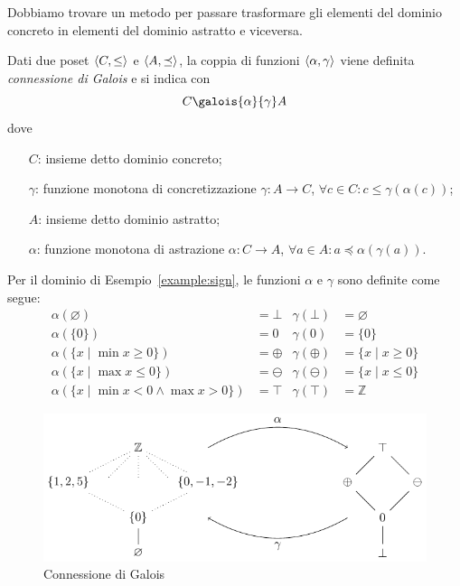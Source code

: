 Dobbiamo trovare un metodo per passare trasformare gli elementi del dominio concreto in elementi del dominio astratto e viceversa. 

\begin{definition}
Dati due poset $\langle C, \le \rangle$ e $\langle A, \preceq \rangle$, la coppia di funzioni $\langle \alpha, \gamma \rangle$ viene definita \emph{connessione di Galois} e si indica con 
\[ C \galois{\alpha}{\gamma} A \]
dove
\begin{itemize}
    \item[$C$:] insieme detto dominio concreto;
    \item[$\gamma$:] funzione monotona di concretizzazione $\gamma : A \to C$, $\forall c \in C : c \le \gamma(\alpha(c))$;
    \item[$A$:] insieme detto dominio astratto;
    \item[$\alpha$:] funzione monotona di astrazione $\alpha : C \to A$, $\forall a \in A : a \preceq \alpha(\gamma(a))$.
\end{itemize}
\end{definition}

\begin{example}
Per il dominio di Esempio~\ref{example:sign}, le funzioni $\alpha$ e $\gamma$ sono definite come segue:
\begin{align*}
    \alpha(\varnothing)                                   & = \bot                 &
    \gamma(\bot)                                          & = \varnothing          \\
    \alpha(\{0\})                                         & = 0                    &
    \gamma(0)                                             & = \{ 0 \}              \\
    \alpha(\{ x \mid \min x \ge 0 \}) & = \oplus          &
    \gamma(\oplus)                                        & = \{ x \mid x \ge 0 \} \\
    \alpha(\{ x \mid \max x \le 0 \}) & = \ominus         &
    \gamma(\ominus)                                       & = \{ x \mid x \le 0 \} \\
    \alpha(\{ x \mid \min x < 0 \land \max x > 0\})       & = \top                 &
    \gamma(\top)                                          & = \mathbb{Z}
\end{align*}
\end{example}

\begin{figure}[htbp]
    \centering
    \includegraphics{capitoli/interpretazione-astratta/immagini/reticolo-segni.pdf}
    \caption{Connessione di Galois}
    \label{fig:galois-Z-sign}
\end{figure}

